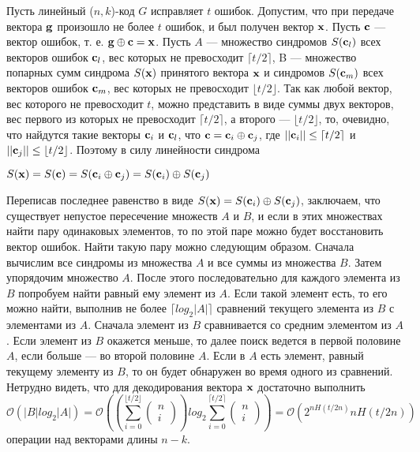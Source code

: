 \documentclass[12pt]{article}
\numberwithin{equation}{section}
\begin{document}
	Пусть линейный ($n,k$)-код $G$ исправляет $t$ ошибок. Допустим, что при	передаче вектора
	${\bf g}$ произошло не более $t$ ошибок, и был получен вектор ${\bf x}$. Пусть ${\bf c}$ — вектор 
	ошибок, т. е. ${\bf g} \oplus {\bf c} = {\bf x}$. Пусть	$A$ — множество синдромов $S({\bf c}_l)$ всех 
	векторов ошибок ${\bf c}_l$, вес которых не превосходит $\lceil t/2 \rceil$, B --- множество попарных 
	сумм синдрома $S({\bf x})$ принятого вектора ${\bf x}$ и синдромов
	$S({\bf c}_m)$ всех векторов ошибок ${\bf c}_m$, вес которых не превосходит $\lfloor t/2 \rfloor$.
	Так как любой вектор, вес которого не превосходит $t$, можно представить в виде суммы двух векторов, 
	вес первого из которых не превосходит $\lceil t/2 \rceil$,
	а второго --- $\lfloor t/2 \rfloor$, то, очевидно, что найдутся такие векторы ${\bf c}_i$ и 
	${\bf c}_l$, что ${\bf c}={\bf c}_i \oplus {\bf c}_j$, где $||{\bf c}_i|| \le \lceil t/2 \rceil$ и 
	$||{\bf c}_j|| \le \lfloor t/2 \rfloor$. Поэтому в силу линейности синдрома
	\begin{center}
		$S({\bf x})=S({\bf c})=S({\bf c}_i \oplus {\bf c}_j)=S({\bf c}_i) \oplus S({\bf c}_j)$
	\end{center}
	Переписав последнее равенство в виде $S({\bf x})=S({\bf c}_i) \oplus S({\bf c}_j)$, заключаем, что	
	существует непустое пересечение множеств $A$ и $B$, и если в этих множествах найти пару одинаковых 
	элементов, то по этой паре можно будет восстановить вектор ошибок. Найти такую пару можно следующим 
	образом. Сначала вычислим все синдромы из множества $A$ и все суммы из множества $B$. Затем упорядочим 
	множество $A$. После этого последовательно для каждого элемента из $B$ попробуем найти равный ему 
	элемент из	$A$. Если такой элемент есть, то его можно найти, выполнив не более $\lceil log_2|A|\rceil$
	сравнений текущего элемента из $B$ с элементами из $A$. Сначала элемент из $B$ сравнивается со средним 
	элементом из $A$. Если элемент из $B$ окажется меньше, то далее поиск ведется в первой половине
	$A$, если больше --- во второй половине	$A$. Если в	$A$ есть элемент, равный текущему элементу из
	$B$, то он будет обнаружен во время одного из сравнений. Нетрудно видеть, что для декодирования вектора
	${\bf x}$ достаточно выполнить
	\begin{equation}\label{eqtwo}
		\mathcal{O}(|B| log_2 |A|)=\mathcal{O}\left(\left(\sum_{i=0}^{\lfloor t/2 \rfloor}
		\begin{pmatrix}
			n \\ i
		\end{pmatrix}
		\right)log_2 \sum_{i=0}^{\lceil t/2 \rceil}
		\begin{pmatrix}
			n \\ i
		\end{pmatrix}
		\right)=\mathcal{O}\left(2^{nH(t/2n)}nH(t/2n)\right) 
	\end{equation}
	операции над векторами длины $n-k$.
	
\end{document}
